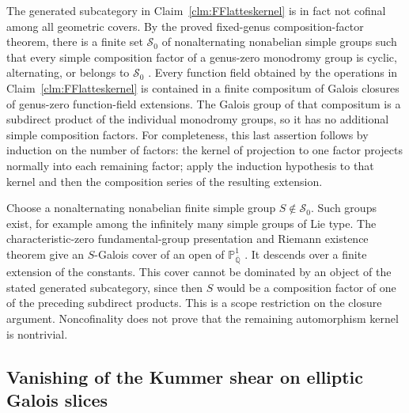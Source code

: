 \documentclass[11pt]{article}
\begin{document}
The generated subcategory in Claim~\ref{clm:FFlatteskernel}
is in fact not cofinal among all geometric covers.
By the proved fixed-genus composition-factor theorem,
there is a finite set \(\mathcal S_0\) of
nonalternating nonabelian simple groups such that every
simple composition factor of a genus-zero monodromy
group is cyclic, alternating, or belongs to
\(\mathcal S_0\)
\citep[Theorem~1.1, with characteristic zero and genus
zero]{FF_Guralnick2003}.
Every function field obtained by the operations in
Claim~\ref{clm:FFlatteskernel} is contained in a finite
compositum of Galois closures of genus-zero function-field
extensions. The Galois group of that compositum is a
subdirect product of the individual monodromy groups,
so it has no additional simple composition factors.
For completeness, this last assertion follows by induction
on the number of factors: the kernel of projection to
one factor projects normally into each remaining factor;
apply the induction hypothesis to that kernel and then
the composition series of the resulting extension.

Choose a nonalternating nonabelian finite simple group
\(S\notin\mathcal S_0\). Such groups exist, for
example among the infinitely many simple groups of
Lie type. The characteristic-zero fundamental-group
presentation and Riemann existence theorem give an
\(S\)-Galois cover of an open of
\(\mathbb P^1_{\overline{\mathbb Q}}\)
\citep[Expos\'es~XII, Th\'eor\`eme~5.1, and~XIII,
Corollaire~2.12]{FF_SGA1}.
It descends over a finite extension of the constants.
This cover cannot be dominated by an object of the
stated generated subcategory, since then \(S\)
would be a composition factor of one of the preceding
subdirect products. This is a scope restriction on the
closure argument. Noncofinality does not prove that the
remaining automorphism kernel is nontrivial.

\subsection{Vanishing of the Kummer shear on elliptic Galois slices}
\end{document}

